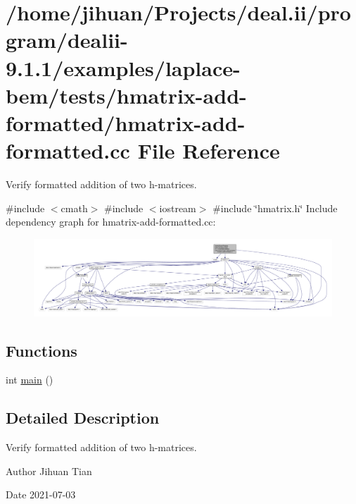 \hypertarget{hmatrix-add-formatted_8cc}{}\section{/home/jihuan/\+Projects/deal.ii/program/dealii-\/9.1.1/examples/laplace-\/bem/tests/hmatrix-\/add-\/formatted/hmatrix-\/add-\/formatted.cc File Reference}
\label{hmatrix-add-formatted_8cc}


Verify formatted addition of two h-\/matrices.  


{\ttfamily \#include $<$cmath$>$}\newline
{\ttfamily \#include $<$iostream$>$}\newline
{\ttfamily \#include \char`\"{}hmatrix.\+h\char`\"{}}\newline
Include dependency graph for hmatrix-\/add-\/formatted.cc\+:\nopagebreak
\begin{figure}[H]
\begin{center}
\leavevmode
\includegraphics[width=350pt]{hmatrix-add-formatted_8cc__incl}
\end{center}
\end{figure}
\subsection*{Functions}
\begin{DoxyCompactItemize}
\item 
int \hyperlink{hmatrix-add-formatted_8cc_ae66f6b31b5ad750f1fe042a706a4e3d4}{main} ()
\end{DoxyCompactItemize}


\subsection{Detailed Description}
Verify formatted addition of two h-\/matrices. 

\begin{DoxyAuthor}{Author}
Jihuan Tian 
\end{DoxyAuthor}
\begin{DoxyDate}{Date}
2021-\/07-\/03 
\end{DoxyDate}


